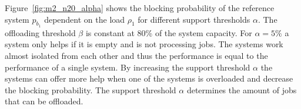 

Figure~\ref{fig:m2_n20_alpha} shows the blocking probability of the reference system $p_{b_1}$ dependent on the load $\rho_1$ for different support thresholds $\alpha$. The offloading threshold $\beta$ is constant at 80\% of the system capacity. For $\alpha=5\%$ a system only helps if it is empty and is not processing jobs. The systems work almost isolated from each other and thus the performance is equal to the performance of a single system. By increasing the support threshold $\alpha$ the systems can offer more help when one of the systems is overloaded and decrease the blocking probability. The support threshold $\alpha$ determines the amount of jobs that can be offloaded.

